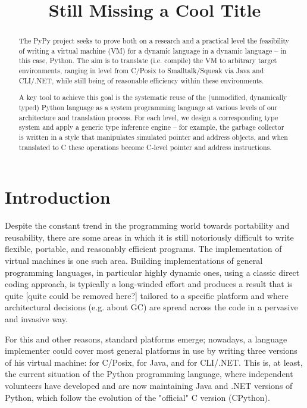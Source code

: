 \documentclass{acm_proc_article-sp}
\begin{document}
\title{Still Missing a Cool Title}


\maketitle

\begin{abstract}
The PyPy project seeks to prove both on a research and a
practical level the feasibility of writing a virtual machine (VM)
for a dynamic language in a dynamic language -- in this case, Python.
The aim is to translate (i.e. compile) the VM to arbitrary target
environments, ranging in level from C/Posix to Smalltalk/Squeak via
Java and CLI/.NET, while still being of reasonable efficiency within
these environments.

A key tool to achieve this goal is the systematic reuse of the
(unmodified, dynamically typed) Python language as a system
programming language at various levels of our architecture and
translation process.  For each level, we design a corresponding type
system and apply a generic type inference engine -- for example, the
garbage collector is written in a style that manipulates
simulated pointer and address objects, and when translated to C
these operations become C-level pointer and address instructions.
\end{abstract}

\section{Introduction}

Despite the constant trend in the programming world towards
portability and reusability, there are some areas in which it is still
notoriously difficult to write flexible, portable, and reasonably
efficient programs.  The implementation of virtual machines is one
such area.  Building implementations of general programming languages,
in particular highly dynamic ones, using a classic direct coding
approach, is typically a long-winded effort and produces a result that
is quite [quite could be removed here?] tailored to a specific
platform and where architectural decisions (e.g. about GC) are spread
across the code in a pervasive and invasive way.

For this and other reasons, standard platforms emerge; nowadays, a
language implementer could cover most general platforms in use by
writing three versions of his virtual machine: for C/Posix, for Java,
and for CLI/.NET.  This is, at least, the current situation of the
Python programming language, where independent volunteers have
developed and are now maintaining Java and .NET versions of Python,
which follow the evolution of the "official" C version (CPython).
\end{document}
